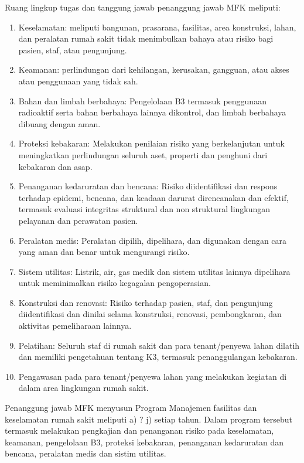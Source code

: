 \documentclass[
]{book}
\providecommand{\tightlist}{%
  \setlength{\itemsep}{0pt}\setlength{\parskip}{0pt}}
\begin{document}
Ruang lingkup tugas dan tanggung jawab penanggung jawab MFK meliputi:

\begin{enumerate}
\def\labelenumi{\alph{enumi}.}
\tightlist
\item
  Keselamatan: meliputi bangunan, prasarana, fasilitas, area konstruksi, lahan, dan peralatan rumah sakit tidak menimbulkan bahaya atau risiko bagi pasien, staf, atau pengunjung.
\item
  Keamanan: perlindungan dari kehilangan, kerusakan, gangguan, atau akses atau penggunaan yang tidak sah.
\item
  Bahan dan limbah berbahaya: Pengelolaan B3 termasuk penggunaan radioaktif serta bahan berbahaya lainnya dikontrol, dan limbah berbahaya dibuang dengan aman.
\item
  Proteksi kebakaran: Melakukan penilaian risiko yang berkelanjutan untuk meningkatkan perlindungan seluruh aset, properti dan penghuni dari kebakaran dan asap.
\item
  Penanganan kedaruratan dan bencana: Risiko diidentifikasi dan respons terhadap epidemi, bencana, dan keadaan darurat direncanakan dan efektif, termasuk evaluasi integritas struktural dan non struktural lingkungan pelayanan dan perawatan pasien.\\
\item
  Peralatan medis: Peralatan dipilih, dipelihara, dan digunakan dengan cara yang aman dan benar untuk mengurangi risiko.
\item
  Sistem utilitas: Listrik, air, gas medik dan sistem utilitas lainnya dipelihara untuk meminimalkan risiko kegagalan pengoperasian.
\item
  Konstruksi dan renovasi: Risiko terhadap pasien, staf, dan pengunjung diidentifikasi dan dinilai selama konstruksi, renovasi, pembongkaran, dan aktivitas pemeliharaan lainnya.
\item
  Pelatihan: Seluruh staf di rumah sakit dan para tenant/penyewa lahan dilatih dan memiliki pengetahuan tentang K3, termasuk penanggulangan kebakaran.
\item
  Pengawasan pada para tenant/penyewa lahan yang melakukan kegiatan di dalam area lingkungan rumah sakit.
\end{enumerate}

Penanggung jawab MFK menyusun Program Manajemen fasilitas dan keselamatan rumah sakit meliputi a) ? j) setiap tahun. Dalam program tersebut termasuk melakukan pengkajian dan penanganan risiko pada keselamatan, keamanan, pengelolaan B3, proteksi kebakaran, penanganan kedaruratan dan bencana, peralatan medis dan sistim utilitas.
\end{document}
